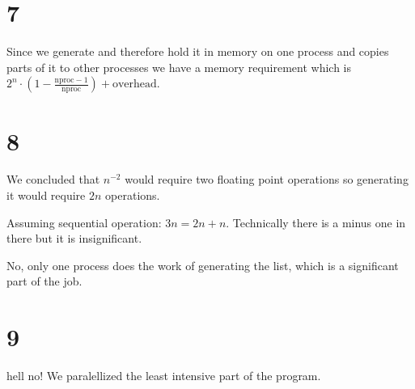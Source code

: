 \section{7}
Since we generate and therefore hold it in memory on one process and copies parts of it to other processes we have a memory requirement which is $2^n\cdot\left(1-\frac{\text{nproc}-1}{\text{nproc}}\right)+\text{overhead}$. 

\section{8}
We concluded that $n^{-2}$ would require two floating point operations so generating it would require $2n$ operations. 

Assuming sequential operation: $3n = 2n+n$. Technically there is a minus one in there but it is insignificant. 

No, only one process does the work of generating the list, which is a significant part of the job. 

\section{9}
hell no! We paralellized the least intensive part of the program. 

